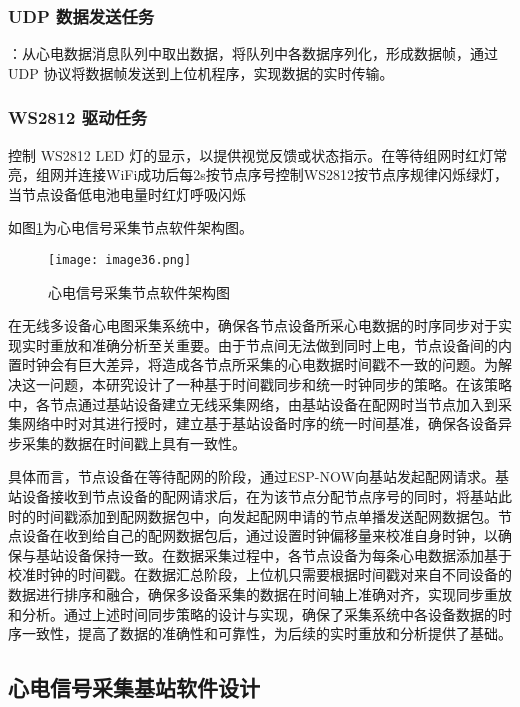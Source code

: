 \subsubsection{UDP 数据发送任务}：从心电数据消息队列中取出数据，将队列中各数据序列化，形成数据帧，通过 UDP 协议将数据帧发送到上位机程序，实现数据的实时传输。

\subsubsection{WS2812 驱动任务}控制 WS2812 LED 灯的显示，以提供视觉反馈或状态指示。在等待组网时红灯常亮，组网并连接WiFi成功后每2s按节点序号控制WS2812按节点序规律闪烁绿灯，当节点设备低电池电量时红灯呼吸闪烁

如图\ref{F.ECG_image36}为心电信号采集节点软件架构图。

\begin{figure}[htb]
    \centering
    \texttt{[image: image36.png]}
    \caption{心电信号采集节点软件架构图}
    \label{F.ECG_image36}
\end{figure}

在无线多设备心电图采集系统中，确保各节点设备所采心电数据的时序同步对于实现实时重放和准确分析至关重要。由于节点间无法做到同时上电，节点设备间的内置时钟会有巨大差异，将造成各节点所采集的心电数据时间戳不一致的问题。为解决这一问题，本研究设计了一种基于时间戳同步和统一时钟同步的策略。在该策略中，各节点通过基站设备建立无线采集网络，由基站设备在配网时当节点加入到采集网络中时对其进行授时，建立基于基站设备时序的统一时间基准，确保各设备异步采集的数据在时间戳上具有一致性。

具体而言，节点设备在等待配网的阶段，通过ESP-NOW向基站发起配网请求。基站设备接收到节点设备的配网请求后，在为该节点分配节点序号的同时，将基站此时的时间戳添加到配网数据包中，向发起配网申请的节点单播发送配网数据包。节点设备在收到给自己的配网数据包后，通过设置时钟偏移量来校准自身时钟，以确保与基站设备保持一致。在数据采集过程中，各节点设备为每条心电数据添加基于校准时钟的时间戳。在数据汇总阶段，上位机只需要根据时间戳对来自不同设备的数据进行排序和融合，确保多设备采集的数据在时间轴上准确对齐，实现同步重放和分析。通过上述时间同步策略的设计与实现，确保了采集系统中各设备数据的时序一致性，提高了数据的准确性和可靠性，为后续的实时重放和分析提供了基础。

\newpage    %

\subsection{心电信号采集基站软件设计}

